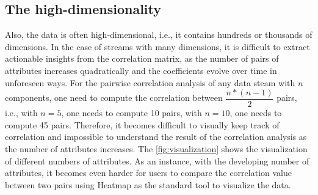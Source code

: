 \subsection{The high-dimensionality}
\label{sec:Introduction:Challenges:High-dimensionality}
Also, the data is often high-dimensional, i.e., it contains hundreds or thousands of dimensions. In the case of streams with many dimensions, it is difficult to extract actionable insights from the correlation matrix, as the number of pairs of attributes increases quadratically and the coefficients evolve over time in unforeseen ways. For the pairwise correlation analysis of any data steam with $n$ components, one need to compute the correlation between $ \dfrac{n*(n-1)}{2} $ pairs, i.e., with $ n=5 $, one needs to compute 10 pairs, with $ n=10 $, one needs to compute 45 pairs. Therefore, it becomes difficult to visually keep track of correlation and impossible to understand the result of the correlation analysis as the number of attributes increases. The \autoref{fig:visualization} shows the visualization of different numbers of attributes. As an instance, with the developing number of attributes, it becomes even harder for users to compare the correlation value between two pairs using Heatmap as the standard tool to visualize the data.\\
